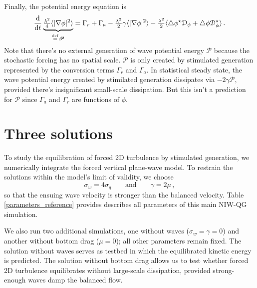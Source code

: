 \documentclass[12pt]{article}
\newcommand{\defn}{\ensuremath{\stackrel{\mathrm{def}}{=}}}
\newcommand{\per}{\, .}
\newcommand{\com}{\, ,}
\def\beq{\begin{equation}}
\def\eeq{\end{equation}}
\newcommand{\lap}{\triangle}
\newcommand{\phis}{\phi^\star}
\def\dd{{\rm d}}
\renewcommand{\P}{\mathscr{P}}
\def\la{\langle}
\def\ra{\rangle}
\newcommand{\?}{\stackrel{?}{=}}
\newcommand{\D}{\mathcal{D}}
\begin{document}
Finally, the potential energy equation  is
\beq
\frac{\dd}{\dd t} \underbrace{\tfrac{\lambda^2}{4} \la |\nabla\phi|^2 \ra}_{\defn \P} = \Gamma_r + \Gamma_a
 -\tfrac{\lambda^2}{2}\gamma \la |\nabla\phi|^2 \ra - \tfrac{\lambda^2}{2} \la \lap\phis\D_\phi + \lap\phi\D_\phis \ra\per
\label{P}
\eeq
Note that there's no external generation of wave potential energy $\P$ because the
stochastic forcing has no spatial scale. $\P$ is only created by stimulated generation represented
by the conversion terms $\Gamma_r$ and $\Gamma_a$. In statistical steady state, the
wave potential energy created by stimilated generation dissipates via $-2\gamma\P$,
provided there's insignificant small-scale dissipation. But this isn't a prediction
for $\P$ since $\Gamma_a$ and $\Gamma_r$ are functions of $\phi$.

\section{Three solutions}
To study the equilibration of forced 2D turbulence by stimulated generation, we
numerically integrate the forced vertical plane-wave model.  To restrain the solutions
within the model's limit of validity, we choose
\beq
\sigma_w = 4 \sigma_q\qquad\text{and}\qquad \gamma = 2\mu\com
\eeq
so that the ensuing wave velocity is stronger than the balanced velocity. Table \ref{parameters_reference}
provides describes all parameters of this main NIW-QG simulation.

We also run two additional simulations, one without waves ($\sigma_w = \gamma = 0$)
and another without bottom drag ($\mu =0$); all other parameters remain fixed. The
solution without waves serves as testbed in which the equilibrated kinetic energy
is predicted. The solution without bottom drag allows us to test whether forced
2D turbulence equilibrates without large-scale dissipation, provided strong-enough
waves damp the balanced flow.
\end{document}
